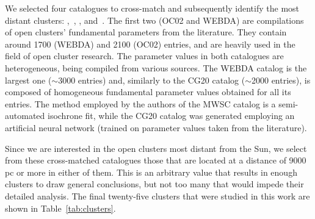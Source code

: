 \documentclass[draft]{aa}
\begin{document}
 We selected four catalogues to cross-match and subsequently identify the most
 distant clusters: \citet[][New Catalog of Optically Visible Open Clusters and
 Candidates, hereinafter OC02]{Dias_2002},~\citet[][WEBDA,\footnote{
 \url{https://webda.physics.muni.cz/}}]{Netopil_2012},
 \citet[][Milky Way Star Clusters Catalog, hereinafter MWSC]{Kharchenko_2012},
 and~\citet[][hereinafter CG20]{Cantat_2020}.
 The first two (OC02 and WEBDA) are compilations of open clusters' fundamental
 parameters from the literature. They contain around 1700 (WEBDA) and 2100 
 (OC02) entries, and are heavily used in the field of open cluster research.
 The parameter values in both catalogues are heterogeneous, being compiled from
 various sources.
 The WEBDA catalog is the largest one ($\sim$3000 entries) and, similarly to the CG20
 catalog ($\sim$2000 entries), is composed of homogeneous fundamental parameter
 values obtained for all its entries. The method employed by the authors of the
 MWSC catalog is a semi-automated isochrone fit, while the CG20 catalog was
 generated employing an artificial neural network (trained on parameter values
 taken from the literature).

 Since we are interested in the open clusters most distant from the Sun, we
 select from these cross-matched catalogues those that are located at a
 distance of 9000 pc or more in either of them. This is an arbitrary value that
 results in enough clusters to draw general conclusions, but not too many that
 would impede their detailed analysis. The final twenty-five clusters that were
 studied in this work are shown in Table~\ref{tab:clusters}.\\
\end{document}
